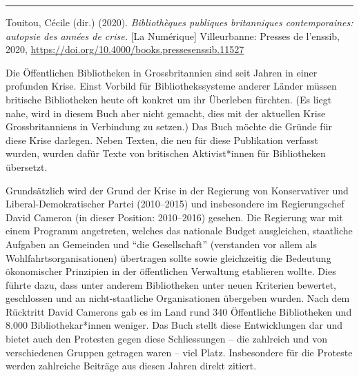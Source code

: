 \documentclass[a4paper,
fontsize=11pt,
oneside,
numbers=noperiodatend,
parskip=half-,
bibliography=totoc,
final
]{scrartcl}
\begin{document}
\begin{center}\rule{0.5\linewidth}{0.5pt}\end{center}

Touitou, Cécile (dir.) (2020). \emph{Bibliothèques publiques
britanniques contemporaines: autopsie des années de crise.} {[}La
Numérique{]} Villeurbanne: Presses de l'enssib, 2020,
\url{https://doi.org/10.4000/books.pressesenssib.11527}

Die Öffentlichen Bibliotheken in Grossbritannien sind seit Jahren in
einer profunden Krise. Einst Vorbild für Bibliothekssysteme anderer
Länder müssen britische Bibliotheken heute oft konkret um ihr Überleben
fürchten. (Es liegt nahe, wird in diesem Buch aber nicht gemacht, dies
mit der aktuellen Krise Grossbritanniens in Verbindung zu setzen.) Das
Buch möchte die Gründe für diese Krise darlegen. Neben Texten, die neu
für diese Publikation verfasst wurden, wurden dafür Texte von britischen
Aktivist*innen für Bibliotheken übersetzt.

Grundsätzlich wird der Grund der Krise in der Regierung von
Konservativer und Liberal-Demo\-kratischer Partei (2010--2015) und
insbesondere im Regierungschef David Cameron (in dieser Position:
2010--2016) gesehen. Die Regierung war mit einem Programm angetreten,
welches das nationale Budget ausgleichen, staatliche Aufgaben an
Gemeinden und \enquote{die Gesellschaft} (verstanden vor allem als
Wohlfahrtsorganisationen) übertragen sollte sowie gleichzeitig die
Bedeutung ökonomischer Prinzipien in der öffentlichen Verwaltung
etablieren wollte. Dies führte dazu, dass unter anderem Bibliotheken
unter neuen Kriterien bewertet, geschlossen und an nicht-staatliche
Organisationen übergeben wurden. Nach dem Rücktritt David Camerons gab
es im Land rund 340 Öffentliche Bibliotheken und 8.000
Bibliothekar*innen weniger. Das Buch stellt diese Entwicklungen dar und
bietet auch den Protesten gegen diese Schliessungen -- die zahlreich und
von verschiedenen Gruppen getragen waren -- viel Platz. Insbesondere für
die Proteste werden zahlreiche Beiträge aus diesen Jahren direkt
zitiert.
\end{document}

